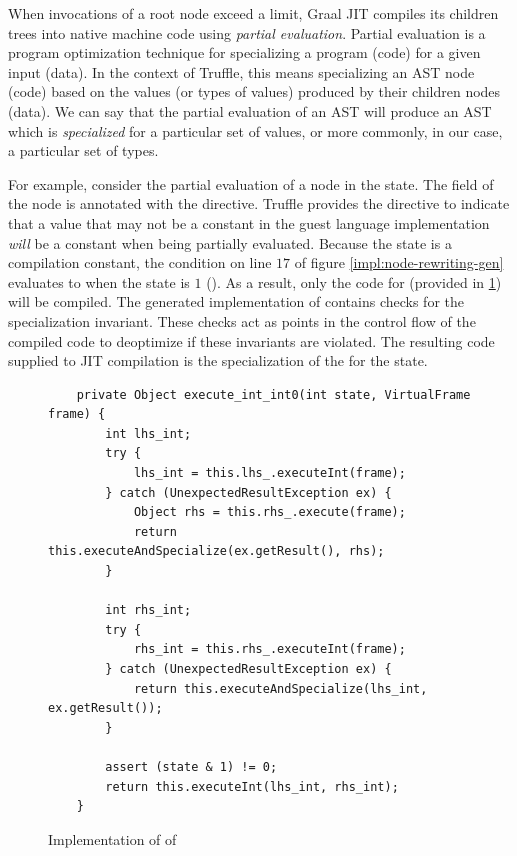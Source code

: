 When invocations of a root node exceed a limit, Graal JIT compiles its children trees into native machine code using \textit{partial evaluation}.
Partial evaluation is a program optimization technique for specializing a program (code) for a given input (data)\cite{futamura:partial-eval}.
In the context of Truffle, this means specializing an AST node (code) based on the values (or types of values) produced by their children nodes (data)\cite{truffle:partial-eval}.
We can say that the partial evaluation of an AST  will produce an AST which is \textit{specialized} for a particular set of values, or more commonly, in our case, a particular set of types.

For example, consider the partial evaluation of a  node in the  state.
The  field of the node is annotated with the  directive.
Truffle provides the  directive to indicate that a value that may not be a constant in the guest language implementation \textit{will} be a constant when being partially evaluated.
Because the state is a compilation constant, the condition on line $17$ of figure \ref{impl:node-rewriting-gen} evaluates to  when the state is $1$ ().
As a result, only the code for  (provided in \ref{impl:node-rewriting-state2}) will be compiled.
The generated implementation of  contains checks for the specialization invariant.
These checks act as points in the control flow of the compiled code to deoptimize if these invariants are violated.
The resulting code supplied to JIT compilation is the specialization of the  for the  state.

\begin{figure}[!htb]
	\begin{verbatim}
    private Object execute_int_int0(int state, VirtualFrame frame) {
		int lhs_int;
		try {
			lhs_int = this.lhs_.executeInt(frame);
		} catch (UnexpectedResultException ex) {
			Object rhs = this.rhs_.execute(frame);
			return this.executeAndSpecialize(ex.getResult(), rhs);
		}
		
		int rhs_int;
		try {
			rhs_int = this.rhs_.executeInt(frame);
		} catch (UnexpectedResultException ex) {
			return this.executeAndSpecialize(lhs_int, ex.getResult());
		}
		
		assert (state & 1) != 0;
		return this.executeInt(lhs_int, rhs_int);
	}
	\end{verbatim}
	\caption{Implementation of  of }
	\label{impl:node-rewriting-state2}
\end{figure}


